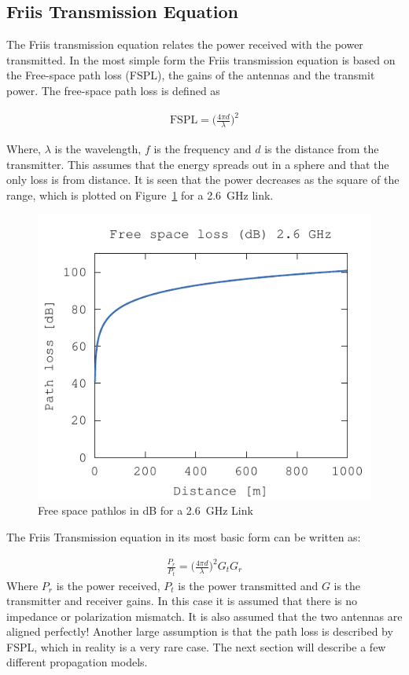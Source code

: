 \subsection{Friis Transmission Equation}
The Friis transmission equation relates the power received with the power transmitted. In the most simple form the Friis transmission equation is based on the Free-space path loss (FSPL), the gains of the antennas and the transmit power. The free-space path loss is defined as

\begin{align}
  \label{eq:fspl}
  \text{FSPL} = \big( \frac{4 \pi d}{\lambda} \big)^2
\end{align}

Where, $\lambda$ is the wavelength, $f$ is the frequency and $d$ is the distance from the transmitter. This assumes that the energy spreads out in a sphere and that the only loss is from distance. It is seen that the power decreases as the square of the range, which is plotted on Figure~\ref{fig:fspl-plot} for a \SI{2.6}{GHz} link.

\begin{figure}[htbp]
  \centering
  \includegraphics[scale=1]{img/analysis/distancePathloss}
  \caption{Free space pathlos in dB for a \SI{2.6}{GHz} Link}
  \label{fig:fspl-plot}
\end{figure}

The Friis Transmission equation in its most basic form can be written as: 

\begin{align}
  \frac{P_r}{P_t} = \big( \frac{4 \pi d}{\lambda} \big)^2 G_{t} G_{r}
\end{align}
Where $P_r$ is the power received, $P_t$ is the power transmitted and $G$ is the transmitter and receiver gains. In this case it is assumed that there is no impedance or polarization mismatch. It is also assumed that the two antennas are aligned perfectly! Another large assumption is that the path loss is described by FSPL, which in reality is a very rare case. The next section will describe a few different propagation models.



